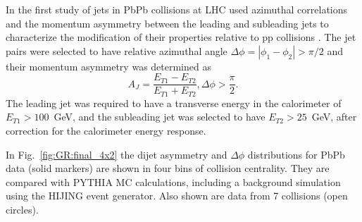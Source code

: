 In the first study of jets in PbPb collisions at LHC used azimuthal correlations and the 
momentum asymmetry between the leading and subleading jets to characterize the modification
of their properties relative to pp collisions \cite{Aad:2010bu}.
The jet pairs were selected to have relative azimuthal angle $\Delta \phi =|\phi_1-\phi_2| > \pi/2$
and their momentum asymmetry was determined as
\begin{equation}
A_J = \frac{E_{T1}-E_{T2}}{E_{T1}+E_{T2}}, \Delta\phi > \frac{\pi}{2}.
\end{equation}
The leading jet was required to have a transverse energy in the calorimeter of $E_{T1} > 100$~GeV,
and the subleading jet was selected to have $E_{T2} > 25$~GeV, after correction for 
the calorimeter energy response. 

In Fig.~\ref{fig:GR:final_4x2} the dijet asymmetry and $\Delta\phi$ distributions for PbPb data (solid markers) 
are shown in four bins of collision centrality. They are compared with PYTHIA MC calculations, including a 
background simulation using the HIJING event generator. Also shown are data from 7\TeV 
\pp collisions (open circles).
